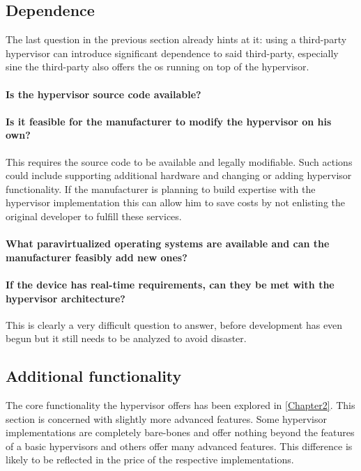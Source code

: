 \subsection{Dependence}
The last question in the previous section already hints at it: using a third-party hypervisor can introduce significant dependence to said third-party, especially sine the third-party also offers the \acrshort{os} running on top of the hypervisor.
\paragraph{Is the hypervisor source code available?}
\paragraph{Is it feasible for the manufacturer to modify the hypervisor on his own?}
This requires the source code to be available and legally modifiable. Such actions could include supporting additional hardware and changing or adding hypervisor functionality. If the manufacturer is planning to build expertise with the hypervisor implementation this can allow him to save costs by not enlisting the original developer to fulfill these services.

\paragraph{What paravirtualized operating systems are available and can the manufacturer feasibly add new ones?}

\paragraph{If the device has real-time requirements, can they be met with the hypervisor architecture?}
This is clearly a very difficult question to answer, before development has even begun but it still needs to be analyzed to avoid disaster.
\subsection{Additional functionality}
The core functionality the hypervisor offers has been explored in \ref{Chapter2}. This section is concerned with slightly more advanced features. Some hypervisor implementations are completely bare-bones and offer nothing beyond the features of a basic hypervisors and others offer many advanced features. This difference is likely to be reflected in the price of the respective implementations.
